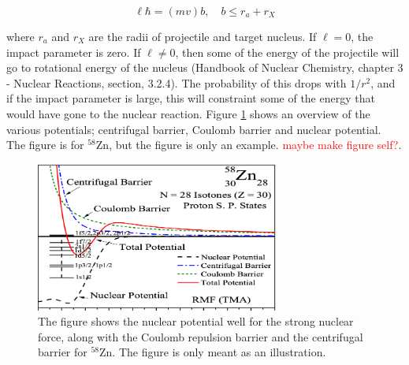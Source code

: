 \documentclass[a4paper,11pt,twoside]{book}
\begin{document}
\begin{equation}
    \ell\hbar = (mv)b, \quad b\leq r_a + r_X
\end{equation}

\noindent where $r_a$ and $r_X$ are the radii of projectile and target nucleus. If $\ell=0$, the impact parameter is zero. If $\ell\neq 0$, then some of the energy of the projectile will go to rotational energy of the nucleus (Handbook of Nuclear Chemistry, chapter 3 - Nuclear Reactions, section, 3.2.4). The probability of this drops with $1/r^2$, and if the impact parameter is large, this will constraint some of the energy that would have gone to the nuclear reaction. Figure \ref{fig:sumOfPotentials} shows an overview of the various potentials; centrifugal barrier, Coulomb barrier and nuclear potential. The figure is for $^{58}$Zn, but the figure is only an example. \textcolor{red}{maybe make figure self?}. 


\begin{figure}
    \centering
    \includegraphics[width=8cm]{Theory/sum_of_potentials.png}
    \caption{The figure shows the nuclear potential well for the strong nuclear force, along with the Coulomb repulsion barrier and the centrifugal barrier for $^{58}$Zn. The figure is only meant as an illustration. %
    }
    \label{fig:sumOfPotentials}
\end{figure}

\end{document}
